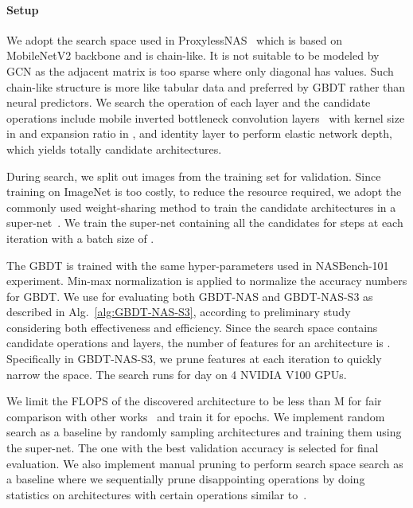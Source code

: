 \documentclass{article}
\begin{document}
\paragraph{Setup}
We adopt the search space used in ProxylessNAS~\cite{proxylessnas} which is based on MobileNetV2 backbone and is chain-like. It is not suitable to be modeled by GCN as the adjacent matrix is too sparse where only diagonal has values. Such chain-like structure is more like tabular data and preferred by GBDT rather than neural predictors. We search the operation of each layer and the candidate operations include mobile inverted bottleneck convolution layers~\cite{mobilenetv2} with kernel size in  and expansion ratio in , and identity layer to perform elastic network depth, which yields totally  candidate architectures. 

During search, we split out  images from the training set for validation. Since training on ImageNet is too costly, to reduce the resource required, we adopt the commonly used weight-sharing method to train the candidate architectures in a super-net~\cite{oneshot,onceforall}. We train the super-net containing all the candidates for  steps at each iteration with a batch size of . 

The GBDT is trained with the same hyper-parameters used in NASBench-101 experiment. Min-max normalization is applied to normalize the accuracy numbers for GBDT. We use  for evaluating both GBDT-NAS and GBDT-NAS-S3 as described in Alg.~\ref{alg:GBDT-NAS-S3}, according to preliminary study considering both effectiveness and efficiency. Since the search space contains  candidate operations and  layers, the number of features for an architecture is . Specifically in GBDT-NAS-S3, we prune  features at each iteration to quickly narrow the space. The search runs for  day on 4 NVIDIA V100 GPUs.

We limit the FLOPS of the discovered architecture to be less than M for fair comparison with other works~\cite{nasnet,amoebanet,darts,efficientnet,pcdarts,pdarts} and train it for  epochs. We implement random search as a baseline by randomly sampling  architectures and training them using the super-net. The one with the best validation accuracy is selected for final evaluation. We also implement manual pruning to perform search space search as a baseline where we sequentially prune disappointing operations by doing statistics on architectures with certain operations similar to~\cite{designspace}.
\end{document}
